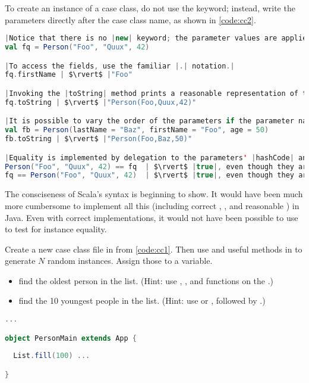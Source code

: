 \documentclass[10 pt]{article}
\begin{document}
To create an instance of a case class, do not use the  keyword; instead, write the parameters directly after the case class name, as shown in \autoref{code:cc2}.

\begin{lstlisting}[caption={Using case class \pcode{Person}}, label={code:cc2}, language=Scala, escapechar=|]
|Notice that there is no |new| keyword; the parameter values are applied directly after the case class name.|
val fq = Person("Foo", "Quux", 42)

|To access the fields, use the familiar |.| notation.|
fq.firstName | $\rvert$ |"Foo"

|Invoking the |toString| method prints a reasonable representation of the case class.|
fq.toString | $\rvert$ |"Person(Foo,Quux,42)"

|It is possible to vary the order of the parameters if the parameter names are also specified. This can help readability.|
val fb = Person(lastName = "Baz", firstName = "Foo", age = 50)
fb.toString | $\rvert$ |"Person(Foo,Baz,50)"

|Equality is implemented by delegation to the parameters' |hashCode| and |equals| methods.|
Person("Foo", "Quux", 42) == fq  | $\rvert$ |true|, even though they are \emph{different} instances.|
fq == Person("Foo", "Quux", 42)  | $\rvert$ |true|, even though they are \emph{different} instances.|
\end{lstlisting}

The consciseness of Scala's syntax is beginning to show. It would have been much more cumbersome to implement all this (including correct , , and reasonable ) in Java. Even with correct implementations, it would not have been possible to use \pcode{==} to test for instance equality. 

\begin{example}
Create a new case class  file in  from \autoref{code:cc1}. Then use  and useful methods in  to generate $N$ random  instances. Assign those to a variable.
\begin{itemize}
  \item find the oldest person in the list. (Hint: use , , and  functions on the .)
  \item find the 10 youngest people in the list. (Hint: use  or , followed by .)
\end{itemize}

\begin{lstlisting}[caption={Pattern matching}, label={code:pmex}, language=Scala, escapechar=|]
...

object PersonMain extends App {
  
  List.fill(100) ...  

}
\end{lstlisting}
\end{example}
\end{document}
